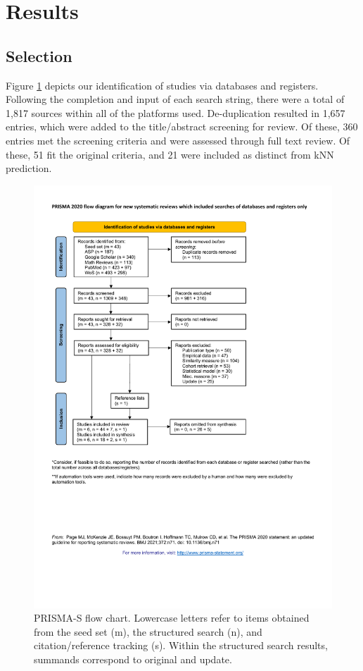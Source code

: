 \documentclass[sn-mathphys,Numbered,pdflatex]{sn-jnl}
\theoremstyle{remark}
\theoremstyle{definition}
\newcommand{\hl}[1]{#1}
\begin{document}
\section{Results}\label{results}

\subsection{Selection}\label{selection}

Figure \ref{fig:prisma} depicts our identification of studies via
databases and registers. Following the completion and input of each
search string, there were a total of 1,817 sources within all of the
platforms used. De-duplication resulted in 1,657 entries, which were
added to the title/abstract screening for review. Of these, 360 entries
met the screening criteria and were assessed through full text review.
Of these, 51 fit the original criteria, and 21 were included as distinct
from \hl{kNN} prediction.

\begin{figure}

{\centering \includegraphics[width=0.8\linewidth]{Fig1} 

}

\caption{\hl{PRISMA-S flow chart.}
 Lowercase letters refer to items obtained from
 the seed set (m),
 the structured search (n), and
 citation/reference tracking (s).
 Within the structured search results,
 summands correspond to original and update.}\label{fig:prisma}
\end{figure}
\end{document}
